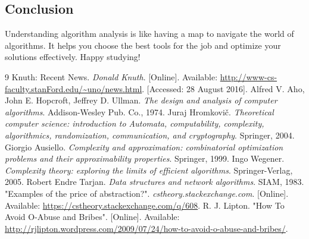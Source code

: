 \documentclass[12pt]{book} %
\begin{document}
\subsection{Conclusion}
Understanding algorithm analysis is like having a map to navigate the world of algorithms. It helps you choose the best tools for the job and optimize your solutions effectively. Happy studying!



\begin{thebibliography}{9}
Knuth: Recent News. \textit{Donald Knuth}. [Online]. Available: \url{http://www-cs-faculty.stanFord.edu/~uno/news.html}. [Accessed: 28 August 2016].
Alfred V. Aho, John E. Hopcroft, Jeffrey D. Ullman. \textit{The design and analysis of computer algorithms}. Addison-Wesley Pub. Co., 1974.
Juraj Hromkovič. \textit{Theoretical computer science: introduction to Automata, computability, complexity, algorithmics, randomization, communication, and cryptography}. Springer, 2004.
Giorgio Ausiello. \textit{Complexity and approximation: combinatorial optimization problems and their approximability properties}. Springer, 1999.
Ingo Wegener. \textit{Complexity theory: exploring the limits of efficient algorithms}. Springer-Verlag, 2005.
Robert Endre Tarjan. \textit{Data structures and network algorithms}. SIAM, 1983.
"Examples of the price of abstraction?". \textit{cstheory.stackexchange.com}. [Online]. Available: \url{https://cstheory.stackexchange.com/q/608}.
R. J. Lipton. "How To Avoid O-Abuse and Bribes". [Online]. Available: \url{http://rjlipton.wordpress.com/2009/07/24/how-to-avoid-o-abuse-and-bribes/}.
\end{thebibliography}
\end{document}
